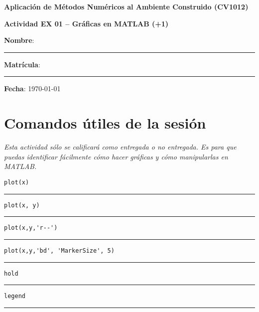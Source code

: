 \documentclass[spanish, 10pt]{article}
\newcommand{\responserule}{{\large\rule{14 cm}{0.3mm}}}
\newcommand{\matlab}[1]{\lstinline[style=Matlab-pyglike]!#1!}
\begin{document}
\begin{center}
	{\Large \textbf{Aplicación de Métodos Numéricos al Ambiente Construido (CV1012)}}
	
	\bigskip
	{\large \textbf{Actividad EX 01 -- Gráficas en MATLAB (+1)}}
\end{center}

\bigskip
{\large \textbf{Nombre}: \rule{13.7 cm}{0.4mm}}



\bigskip
{\large \textbf{Matrícula}: \rule{5 cm}{0.4mm}} \hfill {\large \textbf{Fecha}: \today}


\section*{Comandos útiles de la sesión}

{\small \slshape Esta actividad sólo se calificará como entregada o no entregada.
Es para que puedas identificar fácilmente cómo hacer gráficas y cómo manipularlas en MATLAB.}

\bigskip

\matlab{plot(x)} \hfill \\[1.25ex]
\responserule

\bigskip

\matlab{plot(x, y)} \hfill \\[1.25ex]
\responserule

\bigskip

\matlab{plot(x,y,'r--')} \hfill \\[1.25ex]
\responserule

\bigskip

\matlab{plot(x,y,'bd', 'MarkerSize', 5)} \hfill \\[1.25ex]
\responserule

\bigskip

\matlab{hold} \hfill \\[1.25ex]
\responserule

\bigskip

\matlab{legend} \hfill \\[1.25ex]
\responserule

\bigskip
\end{document}
